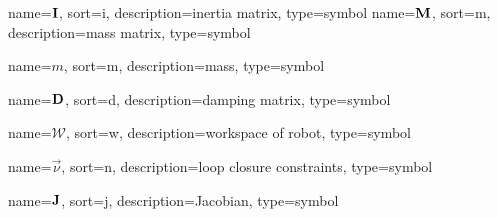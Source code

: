 	{%
		name=\ensuremath{\mat{I}},
			sort=i,
			description=inertia matrix,
			type=symbol
		}
		\newcommand{\inertiamat}{\gls{sym:inertiamat}}
	{%
		name=\ensuremath{\mat{M}},
		sort=m,
		description=mass matrix,
		type=symbol
	}
	\newcommand{\massmat}{\gls{sym:massmat}}

	{%
		name=\ensuremath{m},
		sort=m,
		description=mass,
		type=symbol
	}
	\newcommand{\mass}{\gls{sym:mass}}

	{%
		name=\ensuremath{\mat{D}},
		sort=d,
		description=damping matrix,
		type=symbol
	}
	\newcommand{\dampingmat}{\gls{sym:dampingmat}}

	{%
		name=\ensuremath{\mathcal{W}},
		sort=w,
		description=workspace of robot,
		type=symbol
	}
	\newcommand{\workspace}{\gls{sym:workspace}}

	{%
		name=\ensuremath{\vec{\nu}},
		sort=n,
		description=loop closure constraints,
		type=symbol
	}
	\newcommand{\loopclosureconstraints}{\gls{sym:loopclosureconstraints}}

	{%
		name=\ensuremath{\mat{J}},
		sort=j,
		description=Jacobian,
		type=symbol
	}
	\newcommand{\jac}{\gls{sym:jac}}

